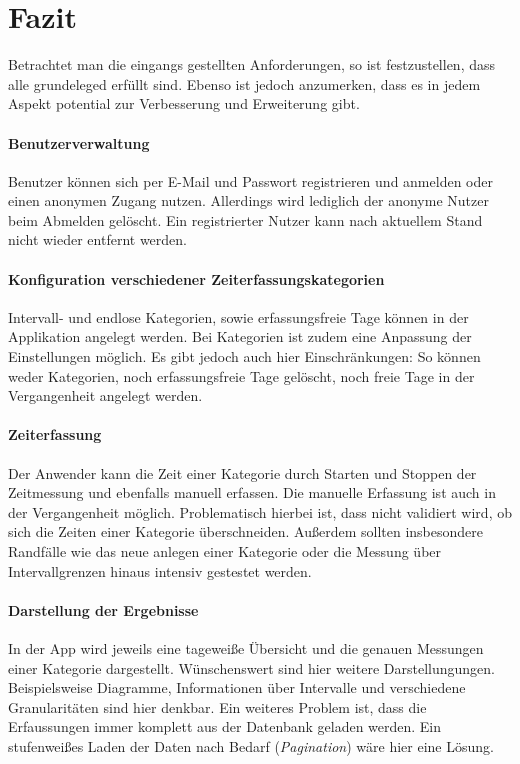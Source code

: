 \section{Fazit}\label{sec:fazit}
Betrachtet man die eingangs gestellten Anforderungen,
so ist festzustellen, dass alle grundeleged erfüllt sind.
Ebenso ist jedoch anzumerken, dass es in jedem Aspekt potential zur Verbesserung und Erweiterung gibt.

\paragraph{Benutzerverwaltung}
Benutzer können sich per E-Mail und Passwort registrieren und anmelden oder einen anonymen Zugang nutzen.
Allerdings wird lediglich der anonyme Nutzer beim Abmelden gelöscht.
Ein registrierter Nutzer kann nach aktuellem Stand nicht wieder entfernt werden.

\paragraph{Konfiguration verschiedener Zeiterfassungskategorien}
Intervall- und endlose Kategorien, sowie erfassungsfreie Tage können in der Applikation angelegt werden.
Bei Kategorien ist zudem eine Anpassung der Einstellungen möglich.
Es gibt jedoch auch hier Einschränkungen: So können weder Kategorien, noch erfassungsfreie Tage gelöscht,
noch freie Tage in der Vergangenheit angelegt werden.

\paragraph{Zeiterfassung}
Der Anwender kann die Zeit einer Kategorie durch Starten und Stoppen der Zeitmessung und ebenfalls manuell erfassen.
Die manuelle Erfassung ist auch in der Vergangenheit möglich.
Problematisch hierbei ist, dass nicht validiert wird, ob sich die Zeiten einer Kategorie überschneiden.
Außerdem sollten insbesondere Randfälle wie das neue anlegen einer Kategorie oder die Messung über Intervallgrenzen hinaus intensiv gestestet werden.

\paragraph{Darstellung der Ergebnisse}
In der App wird jeweils eine tageweiße Übersicht und die genauen Messungen einer Kategorie dargestellt.
Wünschenswert sind hier weitere Darstellungungen.
Beispielsweise Diagramme, Informationen über Intervalle und verschiedene Granularitäten sind hier denkbar.
Ein weiteres Problem ist, dass die Erfaussungen immer komplett aus der Datenbank geladen werden.
Ein stufenweißes Laden der Daten nach Bedarf (\emph{Pagination}) wäre hier eine Lösung.

